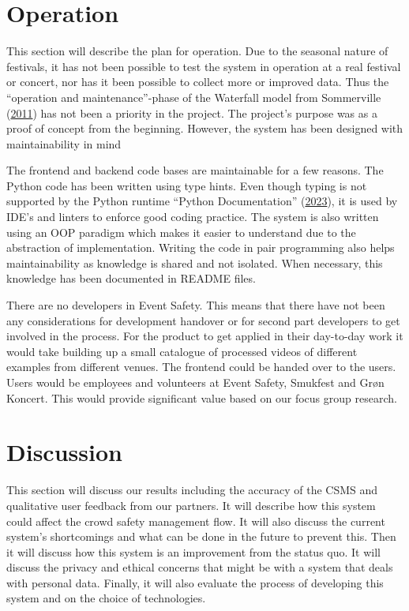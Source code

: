 \documentclass[
]{article}
\begin{document}
\newpage{}

\hypertarget{sec-operation}{%
\section{Operation}\label{sec-operation}}

This section will describe the plan for operation. Due to the seasonal
nature of festivals, it has not been possible to test the system in
operation at a real festival or concert, nor has it been possible to
collect more or improved data. Thus the ``operation and
maintenance''-phase of the Waterfall model from Sommerville
(\protect\hyperlink{ref-sommerville2011software}{2011}) has not been a
priority in the project. The project's purpose was as a proof of concept
from the beginning. However, the system has been designed with
maintainability in mind

The frontend and backend code bases are maintainable for a few reasons.
The Python code has been written using type hints. Even though typing is
not supported by the Python runtime {``Python Documentation''}
(\protect\hyperlink{ref-PythonDocumentation}{2023}), it is used by IDE's
and linters to enforce good coding practice. The system is also written
using an OOP paradigm which makes it easier to understand due to the
abstraction of implementation. Writing the code in pair programming also
helps maintainability as knowledge is shared and not isolated. When
necessary, this knowledge has been documented in README files.

There are no developers in Event Safety. This means that there have not
been any considerations for development handover or for second part
developers to get involved in the process. For the product to get
applied in their day-to-day work it would take building up a small
catalogue of processed videos of different examples from different
venues. The frontend could be handed over to the users. Users would be
employees and volunteers at Event Safety, Smukfest and Grøn Koncert.
This would provide significant value based on our focus group research.

\newpage{}

\hypertarget{sec-discussion}{%
\section{Discussion}\label{sec-discussion}}

This section will discuss our results including the accuracy of the CSMS
and qualitative user feedback from our partners. It will describe how
this system could affect the crowd safety management flow. It will also
discuss the current system's shortcomings and what can be done in the
future to prevent this. Then it will discuss how this system is an
improvement from the status quo. It will discuss the privacy and ethical
concerns that might be with a system that deals with personal data.
Finally, it will also evaluate the process of developing this system and
on the choice of technologies.
\end{document}
